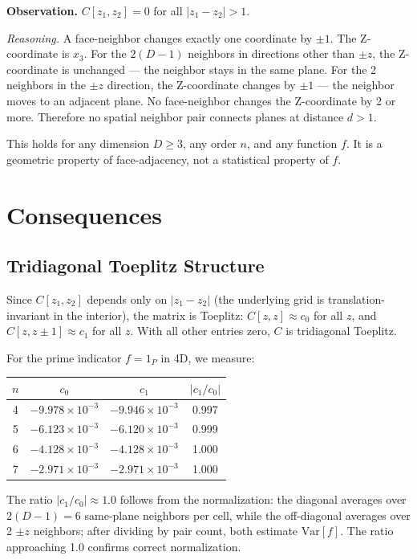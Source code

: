 \documentclass[11pt,a4paper]{article}
\begin{document}
\textbf{Observation.} $C[z_1, z_2] = 0$ for all $|z_1 - z_2| > 1$.

\textit{Reasoning.} A face-neighbor changes exactly one coordinate by
$\pm 1$. The Z-coordinate is $x_3$. For the $2(D-1)$ neighbors in
directions other than $\pm z$, the Z-coordinate is unchanged --- the
neighbor stays in the same plane. For the 2 neighbors in the $\pm z$
direction, the Z-coordinate changes by $\pm 1$ --- the neighbor moves to
an adjacent plane. No face-neighbor changes the Z-coordinate by 2 or more.
Therefore no spatial neighbor pair connects planes at distance $d > 1$.

This holds for any dimension $D \geq 3$, any order $n$, and any function
$f$. It is a geometric property of face-adjacency, not a statistical
property of $f$.

\section{Consequences}

\subsection{Tridiagonal Toeplitz Structure}

Since $C[z_1, z_2]$ depends only on $|z_1 - z_2|$ (the underlying grid is
translation-invariant in the interior), the matrix is Toeplitz:
$C[z,z] \approx c_0$ for all $z$, and $C[z,z\pm 1] \approx c_1$ for all
$z$. With all other entries zero, $C$ is tridiagonal Toeplitz.

For the prime indicator $f = 1_P$ in 4D, we measure:

\begin{center}
\begin{tabular}{cccc}
\toprule
$n$ & $c_0$ & $c_1$ & $|c_1/c_0|$ \\
\midrule
4  & $-9.978 \times 10^{-3}$ & $-9.946 \times 10^{-3}$ & 0.997 \\
5  & $-6.123 \times 10^{-3}$ & $-6.120 \times 10^{-3}$ & 0.999 \\
6  & $-4.128 \times 10^{-3}$ & $-4.128 \times 10^{-3}$ & 1.000 \\
7  & $-2.971 \times 10^{-3}$ & $-2.971 \times 10^{-3}$ & 1.000 \\
\bottomrule
\end{tabular}
\end{center}

The ratio $|c_1/c_0| \approx 1.0$ follows from the normalization: the
diagonal averages over $2(D-1) = 6$ same-plane neighbors per cell, while
the off-diagonal averages over 2 $\pm z$ neighbors; after dividing by
pair count, both estimate $\text{Var}[f]$. The ratio approaching 1.0
confirms correct normalization.
\end{document}
